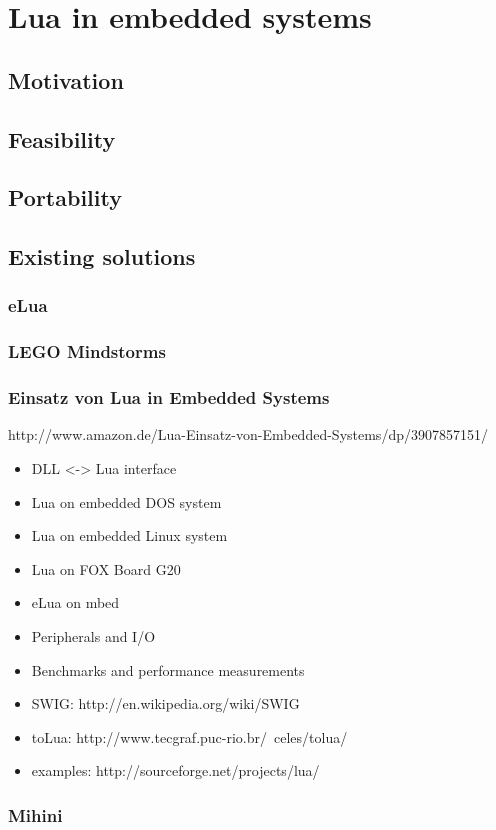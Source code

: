 \chapter{Lua in embedded systems}
\label{ch:lua_in_embedded}

\section{Motivation}


\section{Feasibility}


\section{Portability}


\section{Existing solutions}

\subsection{eLua}

\subsection{LEGO Mindstorms}
\cite{chapter:porting_lua_microcontroller}

\subsection{Einsatz von Lua in Embedded Systems}
http://www.amazon.de/Lua-Einsatz-von-Embedded-Systems/dp/3907857151/

\begin{itemize}
	\item DLL <-> Lua interface
	\item Lua on embedded DOS system
	\item Lua on embedded Linux system
	\item Lua on FOX Board G20
	\item eLua on mbed
	\item Peripherals and I/O
	\item Benchmarks and performance measurements
	\item SWIG: http://en.wikipedia.org/wiki/SWIG
	\item toLua: http://www.tecgraf.puc-rio.br/~celes/tolua/
	\item examples: http://sourceforge.net/projects/lua/
\end{itemize}

\subsection{Mihini}